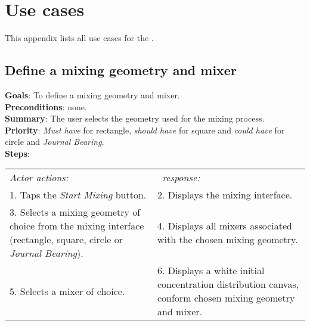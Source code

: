 \chapter{Use cases}
This appendix lists all use cases for the \applicationname.

\section{Define a mixing geometry and mixer}
  \label{geomixer}
  \textbf{Goals}: To define a mixing geometry and mixer.\\
  \textbf{Preconditions}: none.\\
  \textbf{Summary}: The user selects the geometry used for the mixing process.\\
  \textbf{Priority}: \emph{Must have} for rectangle, \emph{should have} for square and \emph{could have} for circle and \emph{Journal Bearing}.\\
  \textbf{Steps}: \\
  \begin{tabular}{ p{} p{} }
  	\emph{Actor actions:} & \emph{\projectname\ response:} \\
	1. Taps the \emph{Start Mixing} button. & 2. Displays the mixing interface.\\
	3. Selects a mixing geometry of choice from the mixing interface (rectangle, square, circle or \emph{Journal Bearing}). & 4. Displays all mixers associated with the chosen mixing geometry. \\
	5. Selects a mixer of choice. & 6. Displays a white initial concentration distribution canvas, conform chosen mixing geometry and mixer.\\
  \end{tabular}
  
